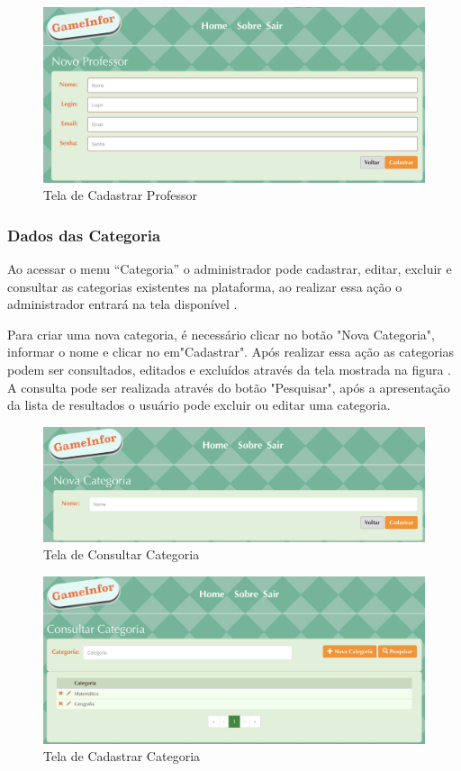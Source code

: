 \begin{figure}[H]
  \centering
  \includegraphics[scale=0.4]{images/proposta-img/Figura4-16.png}
  \caption{Tela de Cadastrar Professor}
  \label{fig:Figura4-16}
\end{figure}
\subsubsection{Dados das Categoria}
Ao acessar o menu “Categoria” o administrador pode cadastrar, editar, excluir e consultar as categorias existentes na plataforma, ao realizar essa ação o administrador entrará na tela disponível . 

Para criar uma nova categoria, é necessário clicar no botão "Nova Categoria", informar o nome e clicar no em"Cadastrar". Após realizar essa ação as categorias podem ser consultados, editados e excluídos através da tela mostrada na figura . A consulta pode ser realizada através do botão "Pesquisar", após a apresentação da lista de resultados o usuário pode excluir ou editar uma categoria.

\begin{figure}[H]
  \centering
  \includegraphics[scale=0.4]{images/proposta-img/Figura4-17.png}
  \caption{Tela de Consultar Categoria}
  \label{fig:Figura4-17}
\end{figure}

\begin{figure}[H]
  \centering
  \includegraphics[scale=0.4]{images/proposta-img/Figura4-18.png}
  \caption{Tela de Cadastrar Categoria}
  \label{fig:Figura4-18}
\end{figure}

